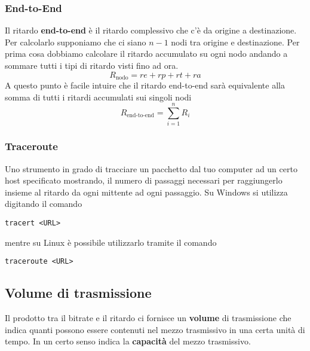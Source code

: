 \subsubsection{End-to-End}
Il ritardo \textbf{end-to-end} è il ritardo complessivo che c'è da origine a destinazione. Per 
calcolarlo supponiamo che ci siano $n-1$ nodi tra origine e destinazione. Per prima cosa dobbiamo
calcolare il ritardo accumulato su ogni nodo andando a sommare tutti i tipi di ritardo visti fino
ad ora.
\[ R_{\text{nodo}} = re + rp + rt + ra \]
A questo punto è facile intuire che il ritardo end-to-end sarà equivalente alla somma di tutti i
ritardi accumulati sui singoli nodi
\[ R_\text{end-to-end} = \sum_{i=1}^n R_i \]

\subsubsection{Traceroute}
Uno strumento in grado di tracciare un pacchetto dal tuo computer ad un certo host specificato
mostrando, il numero di passaggi necessari per raggiungerlo insieme al ritardo da ogni mittente
ad ogni passaggio.
Su Windows si utilizza digitando il comando
\begin{center}
	\verb|tracert <URL>|
\end{center}
mentre su Linux è possibile utilizzarlo tramite il comando 
\begin{center}
	\verb|traceroute <URL>|
\end{center}

\subsection{Volume di trasmissione}
Il prodotto tra il bitrate e il ritardo ci fornisce un \textbf{volume} di trasmissione che indica
quanti possono essere contenuti nel mezzo trasmissivo in una certa unità di tempo. In un certo
senso indica la \textbf{capacità} del mezzo trasmissivo.

